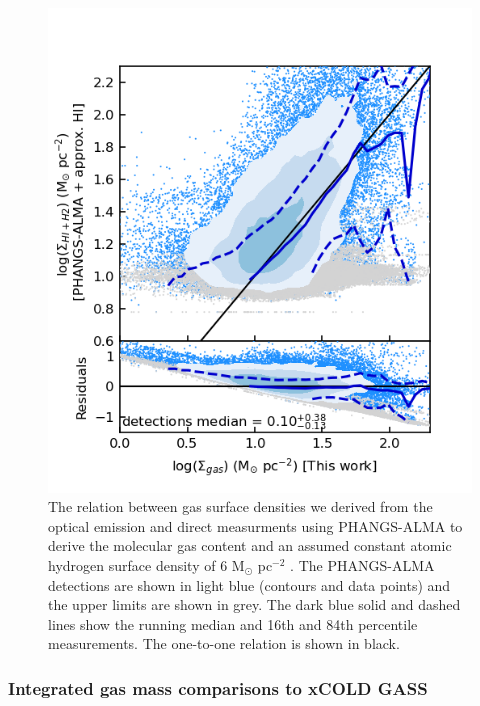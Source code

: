 \documentclass[fleqn,usenatbib]{mnras}
\begin{document}
\begin{figure}
    \centering
    \includegraphics[width=\columnwidth]{figures/fig9.png}
    \caption{The relation between gas surface densities we derived from the optical emission and direct measurments using PHANGS-ALMA to derive the molecular gas content and an assumed constant atomic hydrogen surface density of 6 M$_{\odot}$ pc$^{-2}$ \citep{leroy2021}. The PHANGS-ALMA detections are shown in light blue (contours and data points) and the upper limits are shown in grey. The dark blue solid and dashed lines show the running median and 16th and 84th percentile measurements. The one-to-one relation is shown in black.}
    \label{fig:MUSE_gas_surface_density_comparison_PHANGS_ALMA}
\end{figure}

\subsubsection{Integrated gas mass comparisons to xCOLD GASS}
\label{sec:comparison_xcoldgass}
\end{document}
